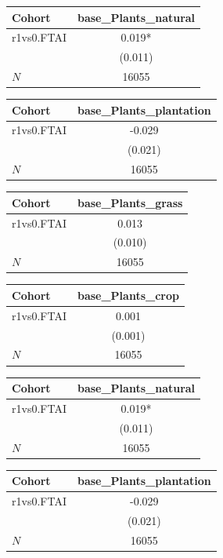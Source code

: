 {
\def\sym#1{\ifmmode^{#1}\else\(^{#1}\)\fi}
\begin{tabular}{l*{1}{c}}
\toprule
Cohort    &base\_Plants\_natural   \\
\midrule
r1vs0.FTAI&    0.019*  \\
          &  (0.011)   \\
\midrule
\(N\)     &    16055   \\
\bottomrule
\end{tabular}
}
{
\def\sym#1{\ifmmode^{#1}\else\(^{#1}\)\fi}
\begin{tabular}{l*{1}{c}}
\toprule
Cohort    &base\_Plants\_plantation   \\
\midrule
r1vs0.FTAI&   -0.029   \\
          &  (0.021)   \\
\midrule
\(N\)     &    16055   \\
\bottomrule
\end{tabular}
}
{
\def\sym#1{\ifmmode^{#1}\else\(^{#1}\)\fi}
\begin{tabular}{l*{1}{c}}
\toprule
Cohort    &base\_Plants\_grass   \\
\midrule
r1vs0.FTAI&    0.013   \\
          &  (0.010)   \\
\midrule
\(N\)     &    16055   \\
\bottomrule
\end{tabular}
}
{
\def\sym#1{\ifmmode^{#1}\else\(^{#1}\)\fi}
\begin{tabular}{l*{1}{c}}
\toprule
Cohort    &base\_Plants\_crop   \\
\midrule
r1vs0.FTAI&    0.001   \\
          &  (0.001)   \\
\midrule
\(N\)     &    16055   \\
\bottomrule
\end{tabular}
}
{
\def\sym#1{\ifmmode^{#1}\else\(^{#1}\)\fi}
\begin{tabular}{l*{1}{c}}
\toprule
Cohort    &base\_Plants\_natural   \\
\midrule
r1vs0.FTAI&    0.019*  \\
          &  (0.011)   \\
\midrule
\(N\)     &    16055   \\
\bottomrule
\end{tabular}
}
{
\def\sym#1{\ifmmode^{#1}\else\(^{#1}\)\fi}
\begin{tabular}{l*{1}{c}}
\toprule
Cohort    &base\_Plants\_plantation   \\
\midrule
r1vs0.FTAI&   -0.029   \\
          &  (0.021)   \\
\midrule
\(N\)     &    16055   \\
\bottomrule
\end{tabular}
}
